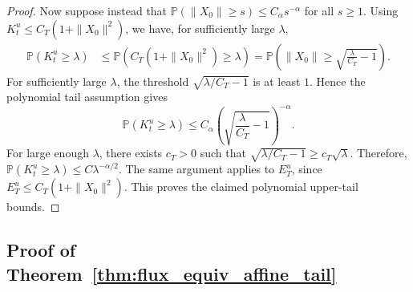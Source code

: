 \documentclass[a4paper,11pt]{article}
\theoremstyle{plain}
\theoremstyle{definition}
\begin{document}
\begin{proof}
Now suppose instead that
\(\mathbb P(\|X_0\|\ge s)\le C_\alpha s^{-\alpha}\) for all \(s\ge 1\).
Using \(K_t^u\le C_T(1+\|X_0\|^2)\), we have, for sufficiently large
\(\lambda\),
\[
\begin{aligned}
    \mathbb P(K_t^u\ge \lambda)
    &\le
    \mathbb P\left(C_T(1+\|X_0\|^2)\ge \lambda\right) =
    \mathbb P\left(\|X_0\|\ge \sqrt{\frac{\lambda}{C_T}-1}\right).
\end{aligned}
\]
For sufficiently large \(\lambda\), the threshold
\(\sqrt{\lambda/C_T-1}\) is at least \(1\). Hence the polynomial tail
assumption gives
\[
    \mathbb P(K_t^u\ge \lambda)
    \le
    C_\alpha
    \left(\sqrt{\frac{\lambda}{C_T}-1}\right)^{-\alpha}.
\]
For large enough \(\lambda\), there exists \(c_T>0\) such that
\(\sqrt{\lambda/C_T-1}\ge c_T\sqrt{\lambda}\). Therefore,
\(
    \mathbb P(K_t^u\ge \lambda)
    \le
    C\lambda^{-\alpha/2}.
\)
The same argument applies to \(E_T^u\), since
\(E_T^u\le C_T(1+\|X_0\|^2)\). This proves the claimed polynomial upper-tail
bounds.
\end{proof}


\subsection{Proof of Theorem~\ref{thm:flux_equiv_affine_tail}}
\end{document}
